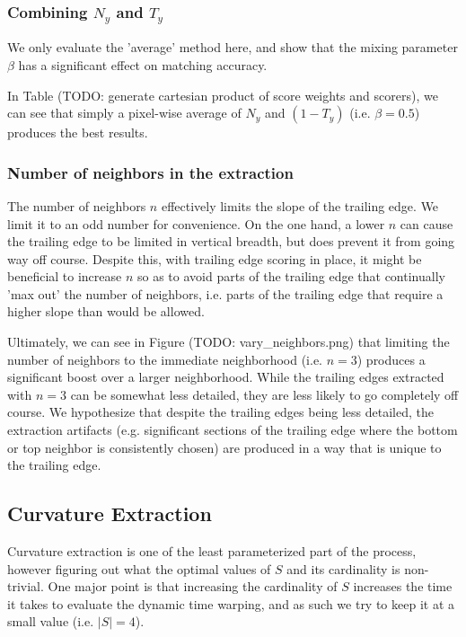 \subsubsection{Combining $N_y$ and $T_y$}

We only evaluate the 'average' method here, and show that the mixing parameter $\beta$ has a significant effect on matching accuracy.

In Table (TODO: generate cartesian product of score weights and scorers), we can see that simply a pixel-wise average of $N_y$ and $(1-T_y)$ (i.e. $\beta = 0.5$) produces the best results.

\subsubsection{Number of neighbors in the extraction}

The number of neighbors $n$ effectively limits the slope of the trailing edge.
We limit it to an odd number for convenience.
On the one hand, a lower $n$ can cause the trailing edge to be limited in vertical breadth, but does prevent it from going way off course.
Despite this, with trailing edge scoring in place, it might be beneficial to increase $n$ so as to avoid parts of the trailing edge that continually 'max out' the number of neighbors, i.e. parts of the trailing edge that require a higher slope than would be allowed.

Ultimately, we can see in Figure (TODO: vary\_neighbors.png) that limiting the number of neighbors to the immediate neighborhood (i.e. $n = 3$) produces a significant boost over a larger neighborhood.
While the trailing edges extracted with $n = 3$ can be somewhat less detailed, they are less likely to go completely off course.
We hypothesize that despite the trailing edges being less detailed, the extraction artifacts (e.g. significant sections of the trailing edge where the bottom or top neighbor is consistently chosen) are produced in a way that is unique to the trailing edge.

\subsection{Curvature Extraction}

Curvature extraction is one of the least parameterized part of the process, however figuring out what the optimal values of $S$ and its cardinality is non-trivial.
One major point is that increasing the cardinality of $S$ increases the time it takes to evaluate the dynamic time warping, and as such we try to keep it at a small value (i.e. $|S| = 4$).

